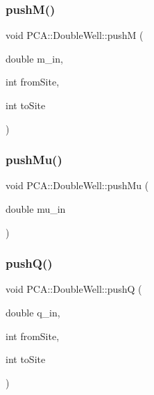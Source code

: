 \hypertarget{class_p_c_a_1_1_double_well_ab8eae104dc47c3a1a6e36d252b6f48bf}{}\label{class_p_c_a_1_1_double_well_ab8eae104dc47c3a1a6e36d252b6f48bf} 
\subsubsection{\texorpdfstring{push\+M()}{pushM()}}
{\footnotesize\ttfamily void P\+C\+A\+::\+Double\+Well\+::pushM (\begin{DoxyParamCaption}\item[{double}]{m\+\_\+in,  }\item[{int}]{from\+Site,  }\item[{int}]{to\+Site }\end{DoxyParamCaption})}

\hypertarget{class_p_c_a_1_1_double_well_ade2e8a266bb471f9283ff0b027b21f2a}{}\label{class_p_c_a_1_1_double_well_ade2e8a266bb471f9283ff0b027b21f2a} 
\subsubsection{\texorpdfstring{push\+Mu()}{pushMu()}}
{\footnotesize\ttfamily void P\+C\+A\+::\+Double\+Well\+::push\+Mu (\begin{DoxyParamCaption}\item[{double}]{mu\+\_\+in }\end{DoxyParamCaption})}

\hypertarget{class_p_c_a_1_1_double_well_a89131b318ca823892cd9d25d1e4199b5}{}\label{class_p_c_a_1_1_double_well_a89131b318ca823892cd9d25d1e4199b5} 
\subsubsection{\texorpdfstring{push\+Q()}{pushQ()}}
{\footnotesize\ttfamily void P\+C\+A\+::\+Double\+Well\+::pushQ (\begin{DoxyParamCaption}\item[{double}]{q\+\_\+in,  }\item[{int}]{from\+Site,  }\item[{int}]{to\+Site }\end{DoxyParamCaption})}



